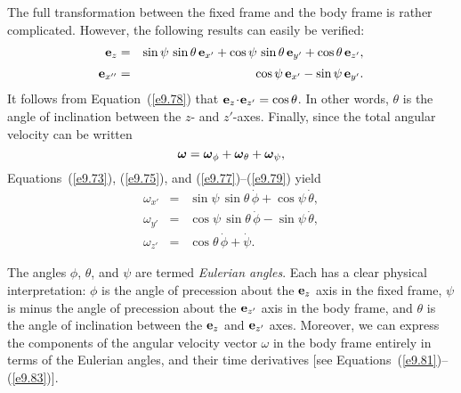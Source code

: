 The full transformation between the fixed frame and the body frame
is rather complicated. However, the following results can easily be
verified:
\begin{eqnarray}\label{e9.78}
{\bf e}_z &=& \sin\psi\,\sin\theta\,{\bf e}_{x'} + \cos\psi\,\sin\theta\,{\bf e}_{y'}
+ \cos\theta\,{\bf e}_{z'},\\[0.5ex]\label{e9.79}
{\bf e}_{x''} &=& \cos\psi\,{\bf e}_{x'} -\sin\psi\,{\bf e}_{y'}.
\end{eqnarray}
It follows from Equation~(\ref{e9.78}) that ${\bf e}_z\!\cdot\!{\bf e}_{z'} =\cos\theta$. In other words, $\theta$ is the angle of inclination between the
$z$- and $z'$-axes.
Finally, since the total angular velocity can be written
\begin{equation}\label{e9.81aa}
\mbox{\boldmath$\omega$} = \mbox{\boldmath$\omega$}_\phi
+\mbox{\boldmath$\omega$}_\theta+\mbox{\boldmath$\omega$}_\psi,
\end{equation}
Equations~(\ref{e9.73}), (\ref{e9.75}), and (\ref{e9.77})--(\ref{e9.79})
yield
\begin{eqnarray}\label{e9.81}
\omega_{x'} &=& \sin\psi\,\sin\theta\,\dot{\phi} +\cos\psi\,\dot{\theta},\\[0.5ex]
\omega_{y'} &=& \cos\psi\,\sin\theta\,\dot{\phi}-\sin\psi\,\dot{\theta},\label{e9.82}\\[0.5ex]\label{e9.83}
\omega_{z'} &=& \cos\theta\,\dot{\phi} +\dot{\psi}.
\end{eqnarray}

The angles $\phi$, $\theta$, and $\psi$ are termed {\em Eulerian angles}. Each has a clear physical interpretation: $\phi$ is the angle of precession
about the ${\bf e}_z$ axis in the fixed frame, $\psi$ is minus the angle of precession about the
${\bf e}_{z'}$ axis in the body frame, and $\theta$ is the angle of inclination
between the ${\bf e}_z$ and ${\bf e}_{z'}$ axes. Moreover, we can
express the components of the angular velocity vector \mbox{\boldmath$\omega$} in the body frame entirely in terms of the Eulerian angles, and their time derivatives  [see Equations~(\ref{e9.81})--(\ref{e9.83})].

